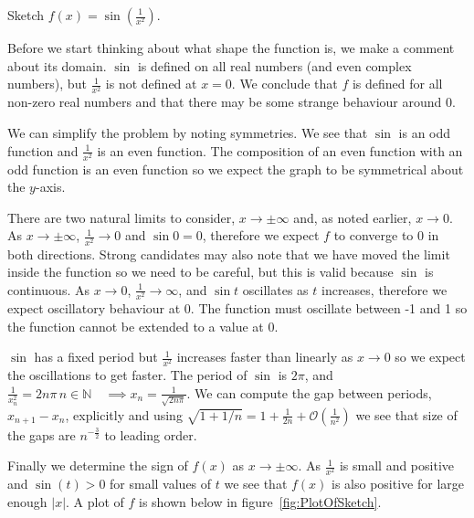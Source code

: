 \question
{}

Sketch $f(x) = \sin \left(\frac{1}{x^2} \right)$.

\begin{solution}

	Before we start thinking about what shape the function is, we make a comment about its domain. $\sin$ is defined on all real numbers (and even complex numbers), but $\frac{1}{x^2}$ is not defined at $x = 0$. We conclude that $f$ is defined for all non-zero real numbers and that there may be some strange behaviour around 0.
	
	We can simplify the problem by noting symmetries. We see that $\sin$ is an odd function and $\frac{1}{x^2}$ is an even function. The composition of an even function with an odd function is an even function so we expect the graph to be symmetrical about the $y$-axis.
	
	There are two natural limits to consider, $x \to \pm \infty$ and, as noted earlier, $x \to 0$. As $x \to \pm\infty$, $\frac{1}{x^2} \to 0$ and $\sin{0} = 0$, therefore we expect $f$ to converge to 0 in both directions. Strong candidates may also note that we have moved the limit inside the function so we need to be careful, but this is valid because $\sin$ is continuous. As $x \to 0$, $\frac{1}{x^2} \to \infty$, and $\sin{t}$ oscillates as $t$ increases, therefore we expect oscillatory behaviour at 0. The function must oscillate between -1 and 1 so the function cannot be extended to a value at 0.
	
	$\sin$ has a fixed period but $\frac{1}{x^2}$ increases faster than linearly as $x \to 0$ so we expect the oscillations to get faster. The period of $\sin$ is $2\pi$, and $\frac{1}{x_n^2} = 2n\pi\, n \in \mathbb{N} \quad \implies x_n = \frac{1}{\sqrt{2n\pi}}$. We can compute the gap between periods, $x_{n+1} - x_n$, explicitly and using $\sqrt{1+1/n} = 1 + \frac{1}{2n} + \mathcal{O}(\frac{1}{n^2})$ we see that size of the gaps are $n^{-\frac{3}{2}}$ to leading order.
	
	Finally we determine the sign of $f(x)$ as $x \to \pm \infty$. As $\frac{1}{x^2}$ is small and positive and $\sin(t) > 0$ for small values of $t$ we see that $f(x)$ is also positive for large enough $|x|$. A plot of $f$ is shown below in figure~\ref{fig:PlotOfSketch}.
	
	\begin{minipage}{\linewidth}
		\centering
\end{minipage}
\end{solution}
